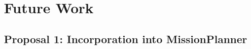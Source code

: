 \chapter{Future Work}
\label{future}

\ifpdf
    \graphicspath{{Chapter5/Figs/Raster/}{Chapter5/Figs/PDF/}{Chapter5/Figs/}}
\else
    \graphicspath{{Chapter5/Figs/Vector/}{Chapter5/Figs/}}
\fi

\section{Proposal 1: Incorporation into MissionPlanner}
\label{future:missionplanner}